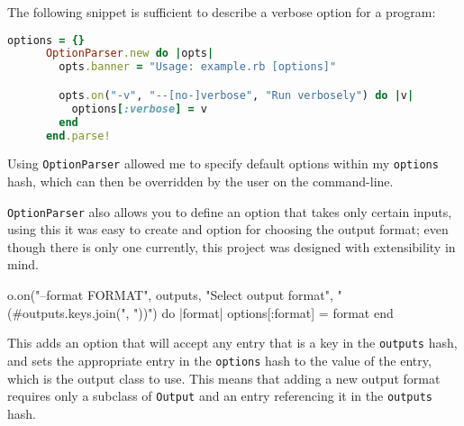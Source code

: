     The following snippet is sufficient to describe a verbose option for a
    program:

    \begin{lstlisting}[language=ruby,gobble=6]
      options = {}
      OptionParser.new do |opts|
        opts.banner = "Usage: example.rb [options]"

        opts.on("-v", "--[no-]verbose", "Run verbosely") do |v|
          options[:verbose] = v
        end
      end.parse!
    \end{lstlisting}

    Using \lstinline|OptionParser| allowed me to specify default options within
    my \lstinline|options| hash, which can then be overridden by the user on the
    command-line.

    \lstinline|OptionParser| also allows you to define an option that takes only
    certain inputs, using this it was easy to create and option for choosing the
    output format; even though there is only one currently, this project was
    designed with extensibility in mind.

    \begin{code}[language=ruby, gobble=6]
      o.on("--format FORMAT", outputs, "Select output format",
           "  (#{outputs.keys.join(", ")})") do |format|
        options[:format] = format
      end
    \end{code}

    This adds an option that will accept any entry that is a key in the
    \lstinline|outputs| hash, and sets the appropriate entry in the
    \lstinline|options| hash to the value of the entry, which is the output
    class to use. This means that adding a new output format requires only a
    subclass of \lstinline|Output| and an entry referencing it in the
    \lstinline|outputs| hash.
